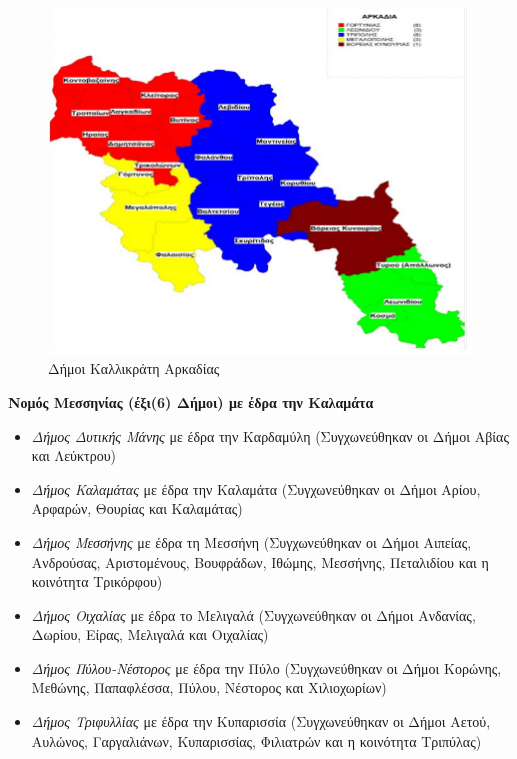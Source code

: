 \documentclass[12pt]{article}
\begin{document}
	\begin{figure} [H]
		\begin{center}
			\includegraphics [scale = 0.60] {arkadia.png}
			\caption{Δήμοι Καλλικράτη Αρκαδίας}
		\end{center}
	\end{figure}

	\textbf{Νομός Μεσσηνίας (έξι(6) Δήμοι) με έδρα την Καλαμάτα}
	\begin{itemize}
		\item \emph{Δήμος Δυτικής Μάνης} με έδρα την Καρδαμύλη (Συγχωνεύθηκαν οι Δήμοι Αβίας και Λεύκτρου)
		\item \emph{Δήμος Καλαμάτας} με έδρα την Καλαμάτα (Συγχωνεύθηκαν οι Δήμοι Αρίου, Αρφαρών, Θουρίας και Καλαμάτας)
		\item \emph{Δήμος Μεσσήνης} με έδρα τη Μεσσήνη (Συγχωνεύθηκαν οι Δήμοι Αιπείας, Ανδρούσας, Αριστομένους, Βουφράδων, Ιθώμης, Μεσσήνης, Πεταλιδίου και η κοινότητα Τρικόρφου)
		\item \emph{Δήμος Οιχαλίας} με έδρα το Μελιγαλά (Συγχωνεύθηκαν οι Δήμοι Ανδανίας, Δωρίου, Είρας, Μελιγαλά και Οιχαλίας)
		\item \emph{Δήμος Πύλου-Νέστορος} με έδρα την Πύλο (Συγχωνεύθηκαν οι Δήμοι Κορώνης, Μεθώνης, Παπαφλέσσα, Πύλου, Νέστορος και Χιλιοχωρίων)
		\item \emph{Δήμος Τριφυλλίας} με έδρα την Κυπαρισσία (Συγχωνεύθηκαν οι Δήμοι Αετού, Αυλώνος, Γαργαλιάνων, Κυπαρισσίας, Φιλιατρών και η κοινότητα Τριπύλας)
	\end{itemize}
\end{document}
